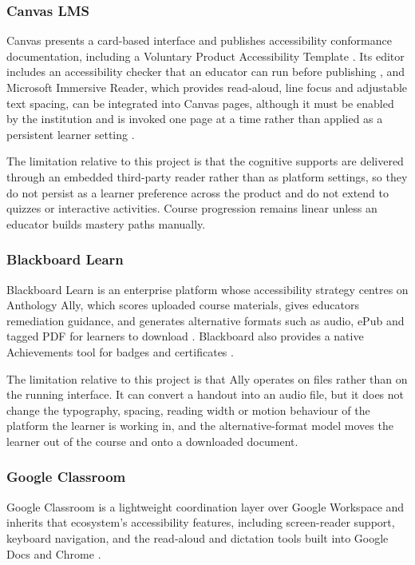 \documentclass[12pt, oneside]{article} %
\begin{document}
\subsubsection{Canvas LMS}
Canvas presents a card-based interface and publishes accessibility conformance documentation, including a Voluntary Product Accessibility Template \cite{canvas_accessibility,canvas_lms}. Its editor includes an accessibility checker that an educator can run before publishing \cite{canvas_a11y_checker}, and Microsoft Immersive Reader, which provides read-aloud, line focus and adjustable text spacing, can be integrated into Canvas pages, although it must be enabled by the institution and is invoked one page at a time rather than applied as a persistent learner setting \cite{canvas_immersive_reader}.

The limitation relative to this project is that the cognitive supports are delivered through an embedded third-party reader rather than as platform settings, so they do not persist as a learner preference across the product and do not extend to quizzes or interactive activities. Course progression remains linear unless an educator builds mastery paths manually.

\subsubsection{Blackboard Learn}
Blackboard Learn is an enterprise platform whose accessibility strategy centres on Anthology Ally, which scores uploaded course materials, gives educators remediation guidance, and generates alternative formats such as audio, ePub and tagged PDF for learners to download \cite{blackboard_ally}. Blackboard also provides a native Achievements tool for badges and certificates \cite{blackboard_achievements}.

The limitation relative to this project is that Ally operates on files rather than on the running interface. It can convert a handout into an audio file, but it does not change the typography, spacing, reading width or motion behaviour of the platform the learner is working in, and the alternative-format model moves the learner out of the course and onto a downloaded document.

\subsubsection{Google Classroom}
Google Classroom is a lightweight coordination layer over Google Workspace and inherits that ecosystem's accessibility features, including screen-reader support, keyboard navigation, and the read-aloud and dictation tools built into Google Docs and Chrome \cite{google_classroom_accessibility,google_classroom}.
\end{document}
